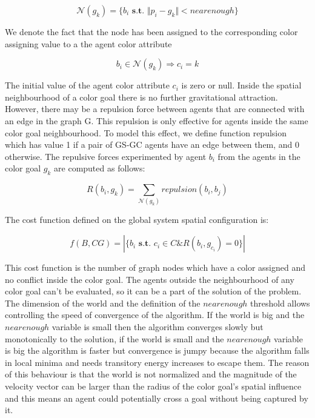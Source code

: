 \begin{equation}
\mathcal{N} \left( g_k \right) = \lbrace b_i \textbf{ s.t. } \Vert p_i - g_k \Vert < nearenough \rbrace
\end{equation}

We denote the fact that the node has been assigned to the corresponding color assigning value to a the agent color attribute

\begin{equation}
b_i \in \mathcal{N}\left( g_k \right) \Rightarrow c_i = k
\end{equation}

The initial value of the agent color attribute $c_i$ is zero or null. Inside the spatial neighbourhood of a color goal there is no further gravitational attraction. However, there may be a repulsion force between agents that are connected with an edge in the graph G. This repulsion is only effective for agents inside the same color goal neighbourhood. To model this effect, we define function repulsion which has value 1 if a pair of GS-GC agents have an edge between them, and 0 otherwise. The repulsive forces experimented by agent $b_i$ from the agents in the color goal $g_k$ are computed as follows:

\begin{equation}
R \left( b_i, g_k \right) = \sum\limits_{\mathcal{N}\left( g_k \right)} repulsion \left( b_i, b_j \right)
\end{equation}

The cost function defined on the global system spatial configuration is:

\begin{equation}
f \left( B, CG \right) = | \lbrace b_i \textbf{ s.t. } c_i \in C \& R \left(b_i, g_{c_i} \right) = 0 \rbrace |
\end{equation}

This cost function is the number of graph nodes which have a color assigned and no conflict inside the color goal. The agents outside the neighbourhood of any color goal can't be evaluated, so it can be a part of the solution of the problem. The dimension of the world and the definition of the $nearenough$ threshold allows controlling the speed of convergence of the algorithm. If the world is big and the $nearenough$ variable is small then the algorithm converges slowly but monotonically to the solution, if the world is small and the $nearenough$ variable is big the algorithm is faster but convergence is jumpy because the algorithm falls in local minima and needs transitory energy increases to escape them. The reason of this behaviour is that the world is not normalized and the magnitude of the velocity vector can be larger than the radius of the color goal's spatial influence and this means an agent could potentially cross a goal without being captured by it.
